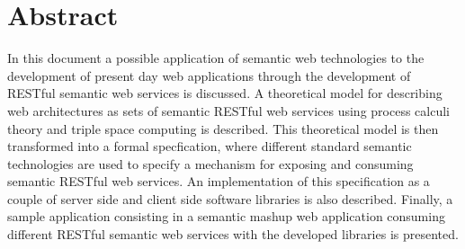 \chapter*{Abstract}
In this document a possible application of semantic web technologies to the development of present day web applications
through the development of RESTful semantic web services is discussed. A theoretical model for describing web
architectures as sets of semantic RESTful web services using process calculi theory and triple space computing is
described. This theoretical model is then transformed into a formal specfication, where different standard semantic
technologies are used to specify a mechanism for exposing and consuming semantic RESTful web services. An implementation
of this specification as a couple of server side and client side software libraries is also described. Finally, a
sample application consisting in a semantic mashup web application consuming different RESTful semantic web services
with the developed libraries is presented.